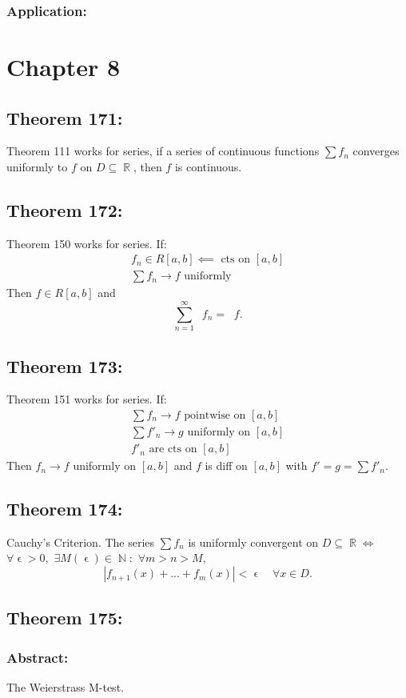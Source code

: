 \documentclass{article}
\DeclareMathOperator\eps{\epsilon}
\DeclareMathOperator\R{\mathbb{R}}
\DeclareMathOperator\N{\mathbb{N}}
\DeclareMathOperator\inti{\int_{a}^{b}}
\begin{document}
\subsubsection*{Application:}
\section*{Chapter 8}
\subsection{Theorem 171:}
Theorem 111 works for series, if a series of continuous functions $\sum f_n$
converges uniformly to $f$ on $D \subseteq \R$, then $f$ is continuous.
\subsection{Theorem 172:}
Theorem 150 works for series. If: \begin{gather}
f_n \in R[a,b] \impliedby \text{ cts on $[a,b]$} \\
\sum f_n \to f \text{ uniformly }
\end{gather}
Then $f \in R[a,b]$ and $$
\sum_{n=1}^{\infty} \inti f_n = \inti f.
$$
\subsection{Theorem 173:}
Theorem 151 works for series. If: \begin{gather}
\sum f_n \to f \text{ pointwise on } [a,b] \\
\sum f'_n \to g \text{ uniformly on } [a,b] \\
f'_n \text{ are cts on } [a,b]
\end{gather}
Then $f_n \to f$ uniformly on $[a,b]$ and $f$ is diff on $[a,b]$ with $f' = g = \sum f'_n$.
\subsection{Theorem 174:}
Cauchy's Criterion. The series $\sum f_n$ is uniformly convergent on $D \subseteq \R \iff$ \\
\newline
$\forall \eps >0,\,\, \exists M(\eps) \in \N:\,\, \forall m>n>M$, $$
|f_{n+1}(x)+...+f_{m}(x)|< \eps \quad \forall x \in D.
$$
\subsection{Theorem 175:}
\subsubsection*{Abstract:}
The Weierstrass M-test.
\end{document}
